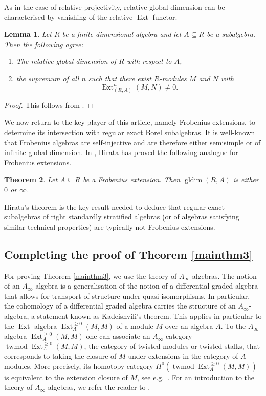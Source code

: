 \documentclass[12pt,a4paper]{amsart}
\theoremstyle{plain}
\newtheorem{thm}{Theorem}[section]
\newtheorem{lem}[thm]{Lemma}
\theoremstyle{definition}
\numberwithin{equation}{thm}
\DeclareMathOperator{\Ext}{Ext}
\DeclareMathOperator{\gldim}{gldim}
\DeclareMathOperator{\twmod}{twmod}
\begin{document}
As in the case of relative projectivity, relative global dimension can be characterised by vanishing of the relative $\Ext$-functor. 

\begin{lem}
Let $R$ be a finite-dimensional algebra and let $A\subseteq R$ be a subalgebra. Then the following agree:
\begin{enumerate}[(1)]
\item The relative global dimension of $R$ with respect to $A$,
\item the supremum of all $n$ such that there exist $R$-modules $M$ and $N$ with 
\[\Ext^n_{(R,A)}(M,N)\neq 0.\]
\end{enumerate}
\end{lem}

\begin{proof}
This follows from \cite[Proposition 3.1, Theorem 3.9]{Hol08}.
\end{proof}

We now return to the key player of this article, namely Frobenius extensions, to determine its intersection with regular exact Borel subalgebras. It is well-known that Frobenius algebras are self-injective and are therefore either semisimple or of infinite global dimension. In \cite[Theorem 10]{Hir59}, Hirata has proved the following analogue for Frobenius extensions.

\begin{thm}\label{hirata_theorem}
Let $A\subseteq R$ be a Frobenius extension. Then $\gldim(R,A)$ is either $0$ or $\infty$. 
\end{thm}

Hirata's theorem is the key result needed
to deduce that regular exact subalgebras of
right standardly stratified algebras (or of algebras satisfying similar technical properties) are typically not Frobenius extensions.

\subsection{Completing the proof of Theorem \ref{mainthm3}}

For proving Theorem \ref{mainthm3}, we use the theory of $A_\infty$-algebras. The notion of an $A_\infty$-algebra is a generalisation of the notion of a differential graded algebra that allows for transport of structure under quasi-isomorphisms. In particular, the cohomology of a differential graded algebra carries the structure of an $A_\infty$-algebra, a statement known as Kadeishvili's theorem. This applies in particular to the $\Ext$-algebra $\Ext^{\geq 0}_A(M,M)$ of a module $M$ over an algebra $A$. To the $A_\infty$-algebra $\Ext^{\geq 0}_A(M,M)$ one can associate an $A_\infty$-category $\twmod \Ext^{\geq 0}_A(M,M)$, the category of twisted modules or twisted stalks, that corresponds to taking the closure of $M$ under extensions in the category of $A$-modules. More precisely, its homotopy category $H^0(\twmod \Ext^{\geq 0}_A(M,M))$ is equivalent to the extension closure of $M$, see e.g.\ \cite[Section 7]{Kel01}.  For an introduction to the theory of $A_\infty$-algebras, we refer the reader to \cite{Kel01, Kel02, LPWZ04, KM25}.
\end{document}
